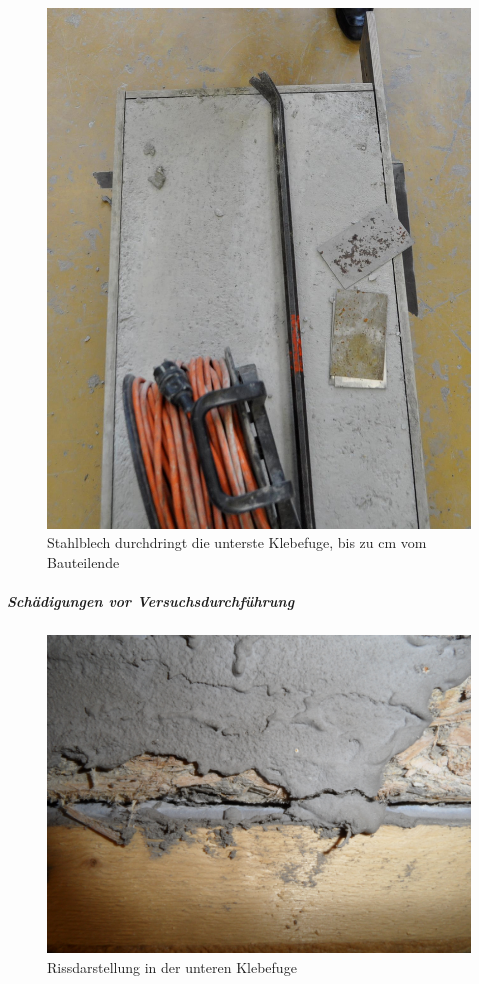 \begin{figure}[h]
\begin{center}
\includegraphics[scale =0.8]{Auswertung/4versuch/schaden_im_endbereich.jpg}
\caption{Stahlblech durchdringt die unterste Klebefuge, bis zu \unit[20]{cm} vom Bauteilende}
\label{4versuch_Stahlblech_Klebefuge}
\end{center}
\end{figure}
\subparagraph{Schädigungen vor Versuchsdurchführung}
\label{abs:BT4_Schaden}


\begin{figure}
\begin{center}
\includegraphics[scale =0.05]{Auswertung/4versuch/riss.jpg}
\caption{Rissdarstellung in der unteren Klebefuge}
\label{riss}
\end{center}
\end{figure}

